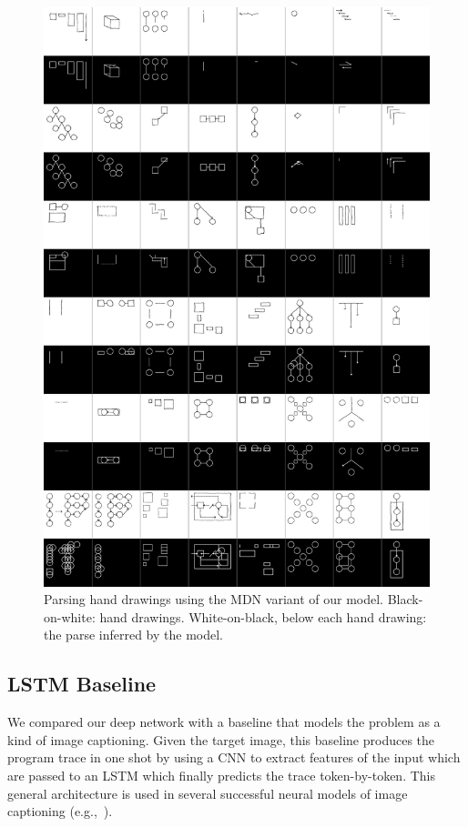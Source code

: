 \documentclass{article}
\begin{document}
\begin{figure}
  \includegraphics[width = \textwidth]{figures/continuousParses.png}
  \caption{Parsing hand drawings using the MDN variant of our
    model. Black-on-white: hand drawings. White-on-black, below each
    hand drawing: the parse inferred by the model.}\label{continuousParses} 
  \end{figure}
\subsection{LSTM Baseline}

We  compared our deep network with a baseline that models the problem as a kind of image captioning.
Given the target image, this baseline produces the program trace in one shot by
using a CNN to extract features of the input which are passed to an LSTM which finally predicts
the trace token-by-token.
This general architecture is used in several successful neural models of image captioning (e.g.,~\cite{vinyals2015show}).
\end{document}

